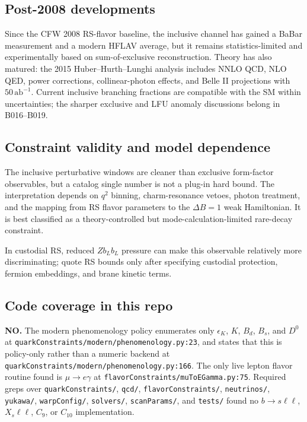 \subsection*{Post-2008 developments}
Since the CFW 2008 RS-flavor baseline, the inclusive channel has gained a
BaBar measurement and a modern HFLAV average, but it remains statistics-limited
and experimentally based on sum-of-exclusive reconstruction.  Theory has also
matured: the 2015 Huber--Hurth--Lunghi analysis includes NNLO QCD, NLO QED,
power corrections, collinear-photon effects, and Belle II projections with
\(50\,\mathrm{ab}^{-1}\).  Current inclusive branching fractions are
compatible with the SM within uncertainties; the sharper exclusive and LFU
anomaly discussions belong in B016--B019.

\subsection*{Constraint validity and model dependence}
The inclusive perturbative windows are cleaner than exclusive form-factor
observables, but a catalog single number is not a plug-in hard bound.  The
interpretation depends on \(q^2\) binning, charm-resonance vetoes, photon
treatment, and the mapping from RS flavor parameters to the \(\Delta B=1\)
weak Hamiltonian.  It is best classified as a theory-controlled but
mode-calculation-limited rare-decay constraint.

In custodial RS, reduced \(Z b_L b_L\) pressure can make this observable
relatively more discriminating; quote RS bounds only after specifying
custodial protection, fermion embeddings, and brane kinetic terms.

\subsection*{Code coverage in this repo}
\textbf{NO.}  The modern phenomenology policy enumerates only
\(\epsilon_K\), \(K\), \(B_d\), \(B_s\), and \(D^0\) at
\texttt{quarkConstraints/modern/phenomenology.py:23}, and states that this is
policy-only rather than a numeric backend at
\texttt{quarkConstraints/modern/phenomenology.py:166}.  The only live lepton
flavor routine found is \(\mu\to e\gamma\) at
\texttt{flavorConstraints/muToEGamma.py:75}.  Required greps over
\texttt{quarkConstraints/}, \texttt{qcd/}, \texttt{flavorConstraints/},
\texttt{neutrinos/}, \texttt{yukawa/}, \texttt{warpConfig/}, \texttt{solvers/},
\texttt{scanParams/}, and \texttt{tests/} found no \(b\to s\ell\ell\),
\(X_s\ell\ell\), \(C_9\), or \(C_{10}\) implementation.

